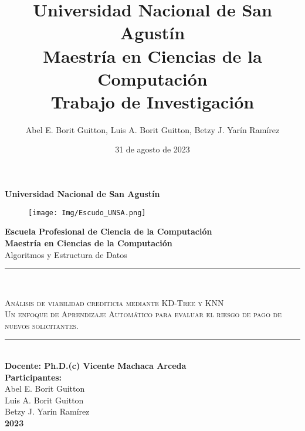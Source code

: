 \documentclass{article}
\title{\textbf{%
    Universidad Nacional de San Agustín \\
    Maestría en Ciencias de la Computación \\
    \large Trabajo de Investigación}}
\author{Abel E. Borit Guitton, Luis A. Borit Guitton, Betzy J. Yarín Ramírez}
\date{31 de agosto de 2023}
\begin{document}
\begin{titlepage}
    \begin{center}

    \centering
            {\huge\textbf{Universidad Nacional de San Agustín}}\\
            \vspace{6mm}
            \begin{figure}[h]
                \centering           
                \texttt{[image: Img/Escudo\_UNSA.png]}
            \end{figure}
            \vspace{6mm}
            {\LARGE\textbf{Escuela Profesional de Ciencia de la Computación}}\\
            \vspace{5mm}
            {\LARGE\textbf{Maestría en Ciencias de la Computación}}
            \vspace{6mm}\\
            {\Large Algoritmos y Estructura de Datos}
            \vspace{5mm}\\
            \textcolor{guinda}{\rule{\linewidth}{0.75mm}}\\
            \vspace{2mm}
            \begin{spacing}{1.5}
            {\LARGE\textsc{Análisis de viabilidad crediticia mediante KD-Tree y KNN}}\\
            {\Large\textsc{Un enfoque de Aprendizaje Automático para evaluar el riesgo de pago de nuevos solicitantes.}}
            \end{spacing}
            \textcolor{guinda}{\rule{\linewidth}{0.75mm}}\\
            \vspace{1cm}
            \Large\textbf{Docente: Ph.D.(c) Vicente Machaca Arceda}\\
            \vspace{1.3cm} 
            \Large\textbf{Participantes:}\\    
            \vspace{3mm}
            \Large Abel E. Borit Guitton \\
            \Large Luis A. Borit Guitton \\
            \Large Betzy J. Yarín Ramírez \\
            \vspace{2cm}
            \Huge\textbf{2023}

    \end{center}
\end{titlepage}
\end{document}
